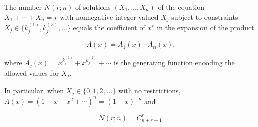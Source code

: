 The number $N(r; n)$ of solutions $(X_1, \ldots, X_n)$ of the equation $X_1 + \cdots + X_n = r$ with nonnegative integer-valued $X_j$ subject to constraints $X_j \in \{k_j^{(1)}, k_j^{(2)}, \ldots\}$ equals the coefficient of $x^r$ in the expansion of the product

$$A(x) = A_1(x) \cdots A_n(x),$$

where $A_j(x) = x^{k_j^{(1)}} + x^{k_j^{(2)}} + \cdots$ is the generating function encoding the allowed values for $X_j$.

In particular, when $X_j \in \{0, 1, 2, \ldots\}$ with no restrictions, $A(x) = (1 + x + x^2 + \cdots)^n = (1-x)^{-n}$ and

$$N(r; n) = C_{n+r-1}^r.$$

